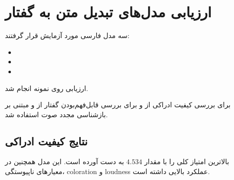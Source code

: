 \section{ارزیابی مدل‌های تبدیل متن به گفتار}

سه مدل  فارسی مورد آزمایش قرار گرفتند:

\begin{itemize}
    \item {}
    \item {}
    \item {}
\end{itemize}

ارزیابی روی
نمونه انجام شد.

برای بررسی کیفیت ادراکی از  و برای بررسی
قابل‌فهم‌بودن گفتار از  و  مبتنی بر بازشناسی مجدد
صوت استفاده شد.


\subsection{نتایج کیفیت ادراکی}

\begin{table}[H]
\centering
\caption{نتایج  برای مدل‌های }
\label{tab:tts_nisqa}

\end{table}

 بالاترین امتیاز کلی  را با مقدار
$4.534$
به دست آورده است.
این مدل همچنین در معیارهای ناپیوستگی، coloration و loudness
عملکرد بالایی داشته است.


